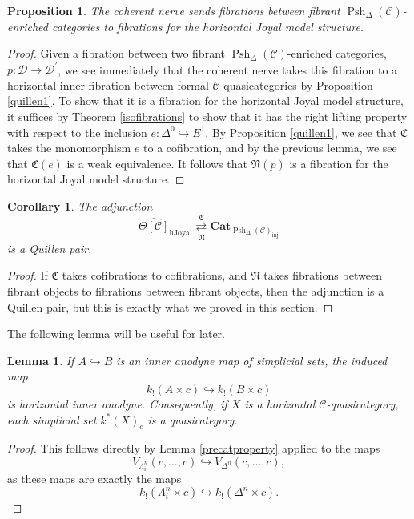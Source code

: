 \documentclass[leqno]{article}
\numberwithin{equation}{subsection}
\theoremstyle{plain}   %
\newtheorem{prop}[equation]{Proposition}
\newtheorem{cor}[equation]{Corollary}
\newtheorem{lemma}[equation]{Lemma}
\theoremstyle{remark}
\theoremstyle{plain}
\newcommand{\Cat}{\ensuremath{\mathbf{Cat}}}
\renewcommand{\C}{\ensuremath{\mathcal{C}}}
\newcommand{\cellset}{\ensuremath{\widehat{\Theta[\mathcal{C}]}}}
\newcommand{\spsh}{\ensuremath{\operatorname{Psh}_\Delta(\mathcal{C})}}
\begin{document}
\begin{prop}
	The coherent nerve sends fibrations between fibrant \(\spsh\)-enriched categories to fibrations for the horizontal Joyal model structure.
\end{prop}
\begin{proof}
	Given a fibration between two fibrant \(\spsh\)-enriched categories, \(p:\mathcal{D}\to \mathcal{D}^\prime\), we see immediately that the coherent nerve takes this fibration to a horizontal inner fibration between formal \(\C\)-quasicategories by Proposition \ref{quillen1}.  To show that it is a fibration for the horizontal Joyal model structure, it suffices by Theorem \ref{isofibrations} to show that it has the right lifting property with respect to the inclusion \(e:\Delta^0 \hookrightarrow E^1\). By Proposition \ref{quillen1}, we see that \(\mathfrak{C}\) takes the monomorphism \(e\) to a cofibration, and by the previous lemma, we see that \(\mathfrak{C}(e)\) is a weak equivalence.  It follows that \(\mathfrak{N}(p)\) is a fibration for the horizontal Joyal model structure.
\end{proof}

\begin{cor}\label{horizquillen}
	The adjunction 
	\[\cellset_{\mathrm{hJoyal}} \underset{\mathfrak{N}}{\overset{\mathfrak{C}}{\rightleftarrows}} \Cat_{\spsh_{\mathrm{inj}}}\]
	is a Quillen pair.
\end{cor}
\begin{proof}
	If \(\mathfrak{C}\) takes cofibrations to cofibrations, and \(\mathfrak{N}\) takes fibrations between fibrant objects to fibrations between fibrant objects, then the adjunction is a Quillen pair, but this is exactly what we proved in this section.
\end{proof}

The following lemma will be useful for later.
\begin{lemma}\label{precatanodyne}
	If \(A\hookrightarrow B\) is an inner anodyne map of simplicial sets, the induced map
	\[k_!(A\times c) \hookrightarrow k_!(B\times c)\] is horizontal inner anodyne. Consequently, if \(X\) is a horizontal \(\C\)-quasicategory, each simplicial set \(k^\ast(X)_c\) is a quasicategory. 
\end{lemma}
\begin{proof}
	This follows directly by Lemma \ref{precatproperty} applied to the maps
	\[V_{\Lambda^n_i}(c,\dots,c) \hookrightarrow V_{\Delta^n}(c,\dots,c),\] as these maps are exactly the maps
	\[k_!(\Lambda^n_i\times c) \hookrightarrow k_!(\Delta^n \times c).\]
\end{proof}
\end{document}
